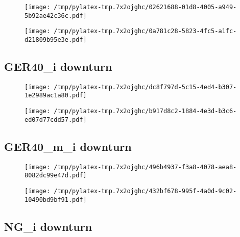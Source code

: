 \documentclass{article}%
\begin{document}
\begin{figure}[htbp]%
\centering%
\texttt{[image: /tmp/pylatex-tmp.7x2ojghc/02621688-01d8-4005-a949-5b92ae42c36c.pdf]}%
\end{figure}

%


\begin{figure}[htbp]%
\centering%
\texttt{[image: /tmp/pylatex-tmp.7x2ojghc/0a781c28-5823-4fc5-a1fc-d21809b95e3e.pdf]}%
\end{figure}

%
\newpage %
\subsection{GER40\_i downturn}%
\label{subsec:GER40idownturn}%


\begin{figure}[htbp]%
\centering%
\texttt{[image: /tmp/pylatex-tmp.7x2ojghc/dc8f797d-5c15-4ed4-b307-1e2989ac1a80.pdf]}%
\end{figure}

%


\begin{figure}[htbp]%
\centering%
\texttt{[image: /tmp/pylatex-tmp.7x2ojghc/b917d8c2-1884-4e3d-b3c6-ed07d77cdd57.pdf]}%
\end{figure}

%
\newpage %
\subsection{GER40\_m\_i downturn}%
\label{subsec:GER40midownturn}%


\begin{figure}[htbp]%
\centering%
\texttt{[image: /tmp/pylatex-tmp.7x2ojghc/496b4937-f3a8-4078-aea8-8082dc99e47d.pdf]}%
\end{figure}

%


\begin{figure}[htbp]%
\centering%
\texttt{[image: /tmp/pylatex-tmp.7x2ojghc/432bf678-995f-4a0d-9c02-10490bd9bf91.pdf]}%
\end{figure}

%
\newpage %
\subsection{NG\_i downturn}%
\label{subsec:NGidownturn}%
\end{document}
